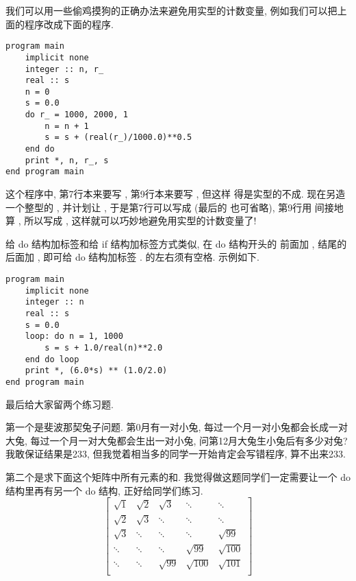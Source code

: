 我们可以用一些偷鸡摸狗的正确办法来避免用实型的计数变量, 例如我们可以把上面的程序改成下面的程序.
\begin{lstlisting}
program main
    implicit none
    integer :: n, r_
    real :: s
    n = 0
    s = 0.0
    do r_ = 1000, 2000, 1
        n = n + 1
        s = s + (real(r_)/1000.0)**0.5
    end do
    print *, n, r_, s
end program main
\end{lstlisting}
这个程序中, 第7行本来要写 , 第9行本来要写 , 但这样  得是实型的不成. 现在另造一个整型的 , 并计划让 , 于是第7行可以写成  (最后的  也可省略), 第9行用  间接地算 , 所以写成 , 这样就可以巧妙地避免用实型的计数变量了!

给 do 结构加标签和给 if 结构加标签方式类似, 在 do 结构开头的  前面加 \ttt{[tag]:}, 结尾的  后面加 \ttt{[tag]}, 即可给 do 结构加标签 \ttt{[tag]}.  的左右须有空格. 示例如下.
\begin{lstlisting}
program main
    implicit none
    integer :: n
    real :: s
    s = 0.0
    loop: do n = 1, 1000
        s = s + 1.0/real(n)**2.0
    end do loop
    print *, (6.0*s) ** (1.0/2.0)
end program main
\end{lstlisting}

最后给大家留两个练习题.

第一个是斐波那契兔子问题. 第0月有一对小兔, 每过一个月一对小兔都会长成一对大兔, 每过一个月一对大兔都会生出一对小兔, 问第12月大兔生小兔后有多少对兔? 我敢保证结果是233, 但我觉着相当多的同学一开始肯定会写错程序, 算不出来233.

第二个是求下面这个矩阵中所有元素的和. 我觉得做这题同学们一定需要让一个 do 结构里再有另一个 do 结构, 正好给同学们练习.\label{hw_2}
\begin{equation*}
    \begin{bmatrix}
        \sqrt{1}     &\sqrt{2}     &\sqrt{3}     &\ddots&\ddots\\
        \sqrt{2}     &\sqrt{3}     &\ddots&\ddots&\ddots\\
        \sqrt{3}     &\ddots&\ddots&\ddots&\sqrt{99}    \\
        \ddots&\ddots&\ddots&\sqrt{99}    &\sqrt{100}    \\
        \ddots&\ddots&\sqrt{99}    &\sqrt{100}   &\sqrt{101}   \\
    \end{bmatrix}
\end{equation*}

